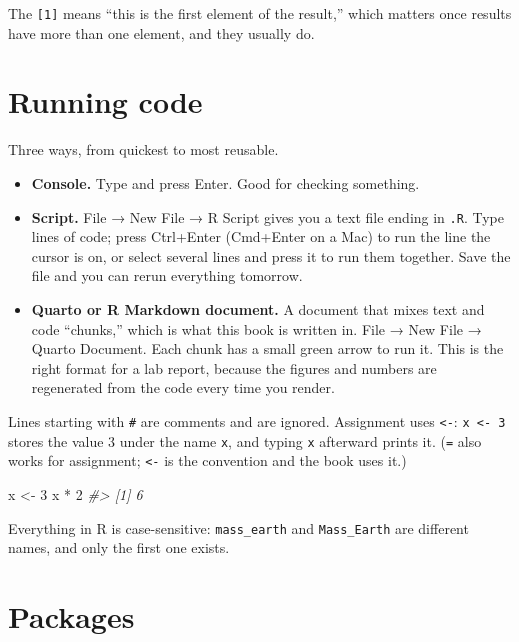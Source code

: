 \documentclass[
  10.5pt,
  letterpaper,
]{scrbook}
\newenvironment{Shaded}{\begin{snugshade}}{\end{snugshade}}
\newcommand{\CommentTok}[1]{\textcolor[rgb]{0.00,0.00,0.00}{\textit{#1}}}
\newcommand{\DecValTok}[1]{\textcolor[rgb]{0.00,0.00,0.00}{#1}}
\newcommand{\NormalTok}[1]{\textcolor[rgb]{0.00,0.00,0.00}{#1}}
\newcommand{\OtherTok}[1]{\textcolor[rgb]{0.00,0.00,0.00}{#1}}
\newcommand{\SpecialCharTok}[1]{\textcolor[rgb]{0.00,0.00,0.00}{#1}}
\providecommand{\tightlist}{%
  \setlength{\itemsep}{0pt}\setlength{\parskip}{0pt}}
\theoremstyle{definition}
\theoremstyle{plain}
\theoremstyle{remark}
\begin{document}
The \texttt{{[}1{]}} means ``this is the first element of the result,''
which matters once results have more than one element, and they usually
do.

\section{Running code}\label{running-code}

Three ways, from quickest to most reusable.

\begin{itemize}
\tightlist
\item
  \textbf{Console.} Type and press Enter. Good for checking something.
\item
  \textbf{Script.} File → New File → R Script gives you a text file
  ending in \texttt{.R}. Type lines of code; press Ctrl+Enter (Cmd+Enter
  on a Mac) to run the line the cursor is on, or select several lines
  and press it to run them together. Save the file and you can rerun
  everything tomorrow.
\item
  \textbf{Quarto or R Markdown document.} A document that mixes text and
  code ``chunks,'' which is what this book is written in. File → New
  File → Quarto Document. Each chunk has a small green arrow to run it.
  This is the right format for a lab report, because the figures and
  numbers are regenerated from the code every time you render.
\end{itemize}

Lines starting with \texttt{\#} are comments and are ignored. Assignment
uses \texttt{\textless{}-}: \texttt{x\ \textless{}-\ 3} stores the value
3 under the name \texttt{x}, and typing \texttt{x} afterward prints it.
(\texttt{=} also works for assignment; \texttt{\textless{}-} is the
convention and the book uses it.)

\begin{Shaded}
\begin{Highlighting}[]
\NormalTok{x }\OtherTok{\textless{}{-}} \DecValTok{3}
\NormalTok{x }\SpecialCharTok{*} \DecValTok{2}
\CommentTok{\#\textgreater{} [1] 6}
\end{Highlighting}
\end{Shaded}

Everything in R is case-sensitive: \texttt{mass\_earth} and
\texttt{Mass\_Earth} are different names, and only the first one exists.

\section{Packages}\label{packages}
\end{document}
